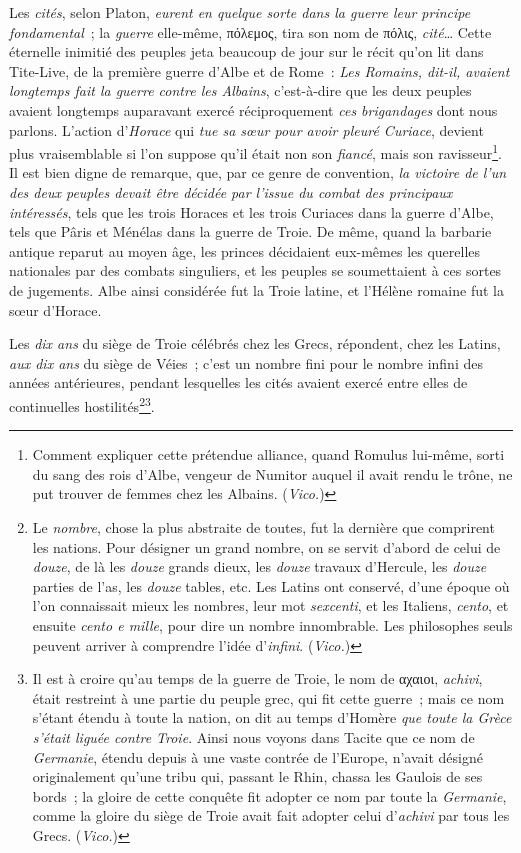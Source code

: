 \documentclass[french,twoside]{book} %
\begin{document}
Les {\itshape cités}, selon Platon, \emph{{\itshape eurent en quelque sorte dans la guerre leur principe fondamental}} ; la {\itshape guerre} elle-même, πόλεμος, tira son nom de πόλις, {\itshape cité}… Cette éternelle inimitié des peuples jeta beaucoup de jour sur le récit qu’on lit dans Tite-Live, de la première guerre d’Albe et de Rome : \emph{{\itshape Les Romains}, dit-il, {\itshape  avaient longtemps fait la guerre contre les Albains}}, c’est-à-dire que les deux peuples avaient longtemps auparavant exercé réciproquement {\itshape ces brigandages} dont nous parlons. L’action d’{\itshape Horace} qui {\itshape tue sa sœur pour avoir pleuré Curiace}, devient plus vraisemblable si l’on suppose qu’il était non son {\itshape fiancé}, mais son ravisseur\footnote{Comment expliquer cette prétendue alliance, quand Romulus lui-même, sorti du sang des rois d’Albe, vengeur de Numitor auquel il avait rendu le trône, ne put trouver de femmes chez les Albains. ({\itshape Vico.})}. Il est bien digne de remarque, que, par ce genre de convention, {\itshape la victoire de l’un des deux peuples devait être décidée par l’issue du combat}  {\itshape des principaux intéressés}, tels que les trois Horaces et les trois Curiaces dans la guerre d’Albe, tels que Pâris et Ménélas dans la guerre de Troie. De même, quand la barbarie antique reparut au moyen âge, les princes décidaient eux-mêmes les querelles nationales par des combats singuliers, et les peuples se soumettaient à ces sortes de jugements. Albe ainsi considérée fut la Troie latine, et l’Hélène romaine fut la sœur d’Horace.\par
Les {\itshape dix ans} du siège de Troie célébrés chez les Grecs, répondent, chez les Latins, {\itshape aux dix ans} du siège de Véies ; c’est un nombre fini pour le nombre infini des années antérieures, pendant lesquelles les cités avaient exercé entre elles de continuelles hostilités\footnote{Le {\itshape nombre}, chose la plus abstraite de toutes, fut la dernière que comprirent les nations. Pour désigner un grand nombre, on se servit d’abord de celui de {\itshape douze}, de là les {\itshape douze} grands dieux, les {\itshape douze} travaux d’Hercule, les {\itshape douze} parties de l’as, les {\itshape douze} tables, etc. Les Latins ont conservé, d’une époque où l’on connaissait mieux les nombres, leur mot {\itshape sexcenti}, et les Italiens, {\itshape cento}, et ensuite {\itshape cento e mille}, pour dire un nombre innombrable. Les philosophes seuls peuvent arriver à comprendre l’idée d’{\itshape infini}. ({\itshape Vico.})}\footnote{Il est à croire qu’au temps de la guerre de Troie, le nom de αχαιοι, {\itshape achivi}, était restreint à une partie du peuple grec, qui fit cette guerre ; mais ce nom s’étant étendu à toute la nation, on dit au temps d’Homère {\itshape que toute la Grèce s’était liguée contre Troie}. Ainsi nous voyons dans Tacite que ce nom de {\itshape Germanie}, étendu depuis à une vaste contrée de l’Europe, n’avait désigné originalement qu’une tribu qui, passant le Rhin, chassa les Gaulois de ses bords ; la gloire de cette conquête fit adopter ce nom par toute la {\itshape Germanie}, comme la gloire du siège de Troie avait fait adopter celui d’{\itshape achivi} par tous les Grecs. ({\itshape Vico.})}.\par
\end{document}
